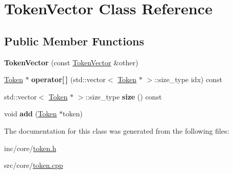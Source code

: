 \hypertarget{classTokenVector}{\section{Token\-Vector Class Reference}
\label{classTokenVector}
}
\subsection*{Public Member Functions}
\begin{DoxyCompactItemize}
\item 
\hypertarget{classTokenVector_ae2103ba63c116b1837d425443a5ce48d}{{\bfseries Token\-Vector} (const \hyperlink{classTokenVector}{Token\-Vector} \&other)}\label{classTokenVector_ae2103ba63c116b1837d425443a5ce48d}

\item 
\hypertarget{classTokenVector_a9adbc1cf57a958a8eb52430f7e205f91}{\hyperlink{classToken}{Token} $\ast$ {\bfseries operator\mbox{[}$\,$\mbox{]}} (std\-::vector$<$ \hyperlink{classToken}{Token} $\ast$ $>$\-::size\-\_\-type idx) const }\label{classTokenVector_a9adbc1cf57a958a8eb52430f7e205f91}

\item 
\hypertarget{classTokenVector_aaddb50ad038adf29571e273f7d92641f}{std\-::vector$<$ \hyperlink{classToken}{Token} $\ast$ $>$\-::size\-\_\-type {\bfseries size} () const }\label{classTokenVector_aaddb50ad038adf29571e273f7d92641f}

\item 
\hypertarget{classTokenVector_aa9864c6f20c4126c37412b74f6ab08e9}{void {\bfseries add} (\hyperlink{classToken}{Token} $\ast$token)}\label{classTokenVector_aa9864c6f20c4126c37412b74f6ab08e9}

\end{DoxyCompactItemize}


The documentation for this class was generated from the following files\-:\begin{DoxyCompactItemize}
\item 
inc/core/\hyperlink{token_8h}{token.\-h}\item 
src/core/\hyperlink{token_8cpp}{token.\-cpp}\end{DoxyCompactItemize}
